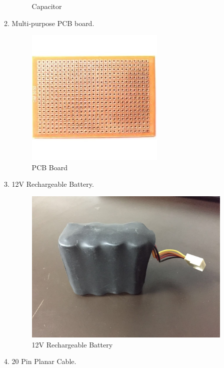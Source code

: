 \documentclass[a4paper,12pt,oneside]{book}
\begin{document}
\begin{itemize}
\begin{enumerate}
\begin{figure}[!ht]
        \caption{Capacitor}
      \end{figure}
    \item Multi-purpose PCB board. \\
    \begin{figure}[!h]
        \centering
        \includegraphics[scale=0.6]{pcb}
        \caption{PCB Board}
      \end{figure}
\newpage
    \item 12V Rechargeable Battery.
    \begin{figure}[!h]
        \centering
        \includegraphics[scale=0.12]{battery}
        \caption{12V Rechargeable Battery}
      \end{figure}
    \item 20 Pin Planar Cable.
    \begin{figure}[!h]
        \centering

\end{figure}
\end{enumerate}
\end{itemize}
\end{document}
